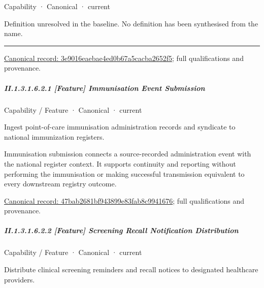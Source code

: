 \label{element:3e9016eaebae4ed0b67a5cacba2652f5}
{\small Capability · Canonical · current}\par

Definition unresolved in the baseline. No definition has been synthesised from the name.



\medskip\hrule\medskip

{\footnotesize \href{../../../../../../../continuum/strategy/capability/3e9016eaebae4ed0b67a5cacba2652f5.md}{Canonical record: 3e9016eaebae4ed0b67a5cacba2652f5}; full qualifications and provenance.}\par
\subparagraph*{II.1.3.1.6.2.1 [Feature] Immunisation Event Submission}
\label{navigation:II.1.3.1.6.2.1}

\label{element:47bab2681bf943899e83fab8c9941676}
{\small Capability / Feature · Canonical · current}\par

Ingest point-of-care immunisation administration records and syndicate to national immunization registers.



Immunisation submission connects a source-recorded administration event with the national register context. It supports continuity and reporting without performing the immunisation or making successful transmission equivalent to every downstream registry outcome.


{\footnotesize \href{../../../../../../../continuum/strategy/capability/feature/47bab2681bf943899e83fab8c9941676.md}{Canonical record: 47bab2681bf943899e83fab8c9941676}; full qualifications and provenance.}\par
\subparagraph*{II.1.3.1.6.2.2 [Feature] Screening Recall Notification Distribution}
\label{navigation:II.1.3.1.6.2.2}

\label{element:7ec85487625349a7b3292585fadb20c7}
{\small Capability / Feature · Canonical · current}\par

Distribute clinical screening reminders and recall notices to designated healthcare providers.



